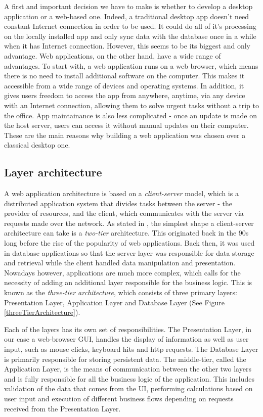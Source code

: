 A first and important decision we have to make is whether to develop a desktop application or a web-based one. Indeed, a traditional desktop app doesn't need constant Internet connection in order to be used. It could do all of it's processing on the locally installed app and only sync data with the database once in a while when it has Internet connection. However, this seems to be its biggest and only advantage. Web applications, on the other hand, have a wide range of advantages. To start with, a web application runs on a web browser, which means there is no need to install additional software on the computer. This makes it accessible from a wide range of devices and operating systems. In addition, it gives users freedom to access the app from anywhere, anytime, via any device with an Internet connection, allowing them to solve urgent tasks without a trip to the office. App maintainance is also less complicated - once an update is made on the host server, users can access it without manual updates on their computer. These are the main reasons why building a web application was chosen over a classical desktop one.


\subsection{Layer architecture}
\label{subsection:layerArchitecture}

A web application architecture is based on a \textit{client-server} model, which is a distributed application system that divides tasks between the server - the provider of resources, and the client, which communicates with the server via requests made over the network. As stated in \cite{databaseProgrammingWithJdbcAndJava}, the simplest shape a client-server architecture can take is a \textit{two-tier} architecture. This originated back in the 90s long before the rise of the popularity of web applications. Back then, it was used in database applications so that the server layer was responsible for data storage and retrieval while the client handled data manipulation and presentation. Nowadays however, applications are much more complex, which calls for the necessity of adding an additional layer responsible for the business logic. This is known as the \textit{three-tier architecture}, which consists of three primary layers: Presentation Layer, Application Layer and Database Layer (See Figure \ref{threeTierArchitecture}).

Each of the layers has its own set of responsibilities. The Presentation Layer, in our case a web-browser GUI, handles the display of information as well as user input, such as mouse clicks, keyboard hits and http requests. The Database Layer is primarily responsible for storing persistent data. The middle-tier, called the Application Layer, is the means of communication between the other two layers and is fully responsible for all the business logic of the application. This includes validation of the data that comes from the UI, performing calculations based on user input and execution of different business flows depending on requests received from the Presentation Layer.

